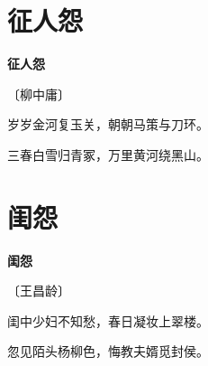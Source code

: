 \documentclass[12pt,UTF-8,openany,fontset=none]{ctexbook}
\begin{document}
\vspace{8pt}
\clearpage

\section{征人怨}


\begin{center}
    {\bfseries 征人怨}

    \vspace{18pt}

    \begin{large}\xuwen
        〔柳中庸〕
    \end{large}

\end{center}

    \vspace{18pt}

\begin{center}
    \begin{Large}

        岁岁金河复玉关，朝朝马策与刀环。

        三春白雪归青冢，万里黄河绕黑山。

    \end{Large}

\end{center}

\vspace{8pt}
\clearpage

\section{闺怨}


\begin{center}
    {\bfseries 闺怨}

    \vspace{18pt}

    \begin{large}\xuwen
        〔王昌龄〕
    \end{large}

\end{center}

    \vspace{18pt}

\begin{center}
    \begin{Large}

        闺中少妇不知愁，春日凝妆上翠楼。

        忽见陌头杨柳色，悔教夫婿觅封侯。

    \end{Large}

\end{center}
\end{document}
